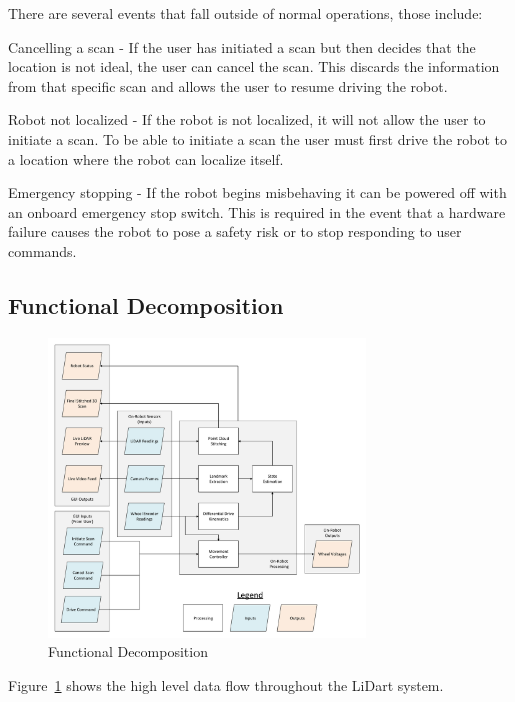\documentclass[12pt]{article}
\begin{document}
There are several events that fall outside of normal operations, those include:

Cancelling a scan - If the user has initiated a scan but then decides that the location is not ideal, the user can cancel the scan. This discards the information from that specific scan and allows the user to resume driving the robot.

Robot not localized - If the robot is not localized, it will not allow the user to initiate a scan. To be able to initiate a scan the user must first drive the robot to a location where the robot can localize itself.

Emergency stopping - If the robot begins misbehaving it can be powered off with an onboard emergency stop switch. This is required in the event that a hardware failure causes the robot to pose a safety risk or to stop responding to user commands.

\subsection{Functional Decomposition}

\begin{figure}[H]
\begin{center}
    \includegraphics[width=0.75\textwidth]{Figures/Functional Decomposition.pdf}
\caption{Functional Decomposition}
\label{Fig_FunctionalDecomposition} 
\end{center}
\end{figure}

Figure~\ref{Fig_FunctionalDecomposition} shows the high level data flow throughout the LiDart system. 
\end{document}
